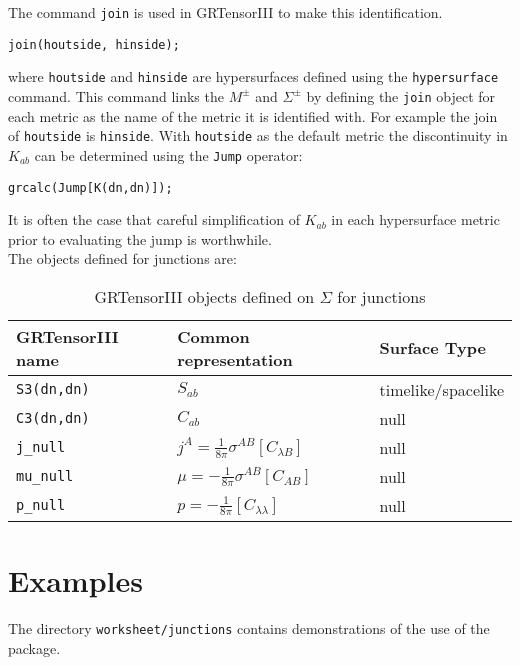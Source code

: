 \documentclass{article}
\begin{document}
The command \texttt{join} is used in GRTensorIII to make this identification.
\begin{verbatim}
join(houtside, hinside);
\end{verbatim}
where \texttt{houtside} and \texttt{hinside} are hypersurfaces defined using the \texttt{hypersurface} command. This command
links the $M^\pm$ and $\Sigma^\pm$ by defining the \texttt{join} object for each metric as the name of the metric it is identified with. 
For example the join of \texttt{houtside} is \texttt{hinside}. With \texttt{houtside} as the default metric the discontinuity in $K_{ab}$ can be determined
using the \texttt{Jump} operator:
\begin{verbatim}
grcalc(Jump[K(dn,dn)]);
\end{verbatim}

It is often the case that careful simplification of $K_{ab}$ in each hypersurface metric prior to evaluating the jump is worthwhile. \\

The objects defined for junctions are:
\renewcommand{\arraystretch}{1.5}
\begin{table}[h]
  \begin{center}
    \begin{tabular}{lll}\hline\hline
      \textbf{GRTensorIII name} & \textbf{Common representation} & Surface Type \\ \hline
      \texttt{S3(dn,dn)}        & $S_{ab} $ & timelike/spacelike  \\
      \texttt{C3(dn,dn)}        & $C_{ab} $ & null \\
      \texttt{j\_null}   & $ j^A = \frac{1}{8 \pi} \sigma^{AB} \left[C_{\lambda B}\right]$ & null \\
      \texttt{mu\_null}   &$ \mu= - \frac{1}{8 \pi} \sigma^{AB} \left[C_{AB}\right]$ & null \\
      \texttt{p\_null}   &$ p = -\frac{1}{8 \pi} \left[C_{\lambda \lambda}\right]$ & null \\
    \end{tabular}
    \caption{GRTensorIII objects defined on $\Sigma$ for junctions}
    \label{tab:junc}
  \end{center}
\end{table}

\FloatBarrier
\section{Examples}
The directory \texttt{worksheet/junctions} contains demonstrations of the use of the package.\\
\end{document}
